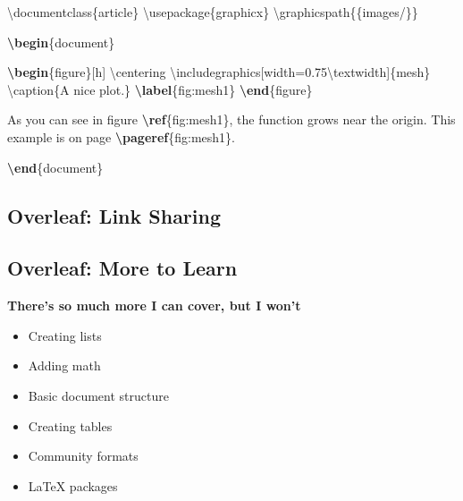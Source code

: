 \documentclass[
  letterpaper,
  DIV=11,
  numbers=noendperiod]{scrartcl}
\newenvironment{Shaded}{\begin{snugshade}}{\end{snugshade}}
\newcommand{\BuiltInTok}[1]{\textcolor[rgb]{0.00,0.23,0.31}{#1}}
\newcommand{\ExtensionTok}[1]{\textcolor[rgb]{0.00,0.23,0.31}{#1}}
\newcommand{\FunctionTok}[1]{\textcolor[rgb]{0.28,0.35,0.67}{#1}}
\newcommand{\KeywordTok}[1]{\textcolor[rgb]{0.00,0.23,0.31}{\textbf{#1}}}
\newcommand{\NormalTok}[1]{\textcolor[rgb]{0.00,0.23,0.31}{#1}}
\providecommand{\tightlist}{%
  \setlength{\itemsep}{0pt}\setlength{\parskip}{0pt}}\usepackage{longtable,booktabs,array}
\begin{document}
\begin{Shaded}
\begin{Highlighting}[numbers=left,,]
\BuiltInTok{\textbackslash{}documentclass}\NormalTok{\{}\ExtensionTok{article}\NormalTok{\}}
\BuiltInTok{\textbackslash{}usepackage}\NormalTok{\{}\ExtensionTok{graphicx}\NormalTok{\}}
\FunctionTok{\textbackslash{}graphicspath}\NormalTok{\{\{images/\}\}}
 
\KeywordTok{\textbackslash{}begin}\NormalTok{\{}\ExtensionTok{document}\NormalTok{\}}

\KeywordTok{\textbackslash{}begin}\NormalTok{\{}\ExtensionTok{figure}\NormalTok{\}[h]}
    \FunctionTok{\textbackslash{}centering}
    \BuiltInTok{\textbackslash{}includegraphics}\NormalTok{[width=0.75}\FunctionTok{\textbackslash{}textwidth}\NormalTok{]\{}\ExtensionTok{mesh}\NormalTok{\}}
    \FunctionTok{\textbackslash{}caption}\NormalTok{\{A nice plot.\}}
    \KeywordTok{\textbackslash{}label}\NormalTok{\{}\ExtensionTok{fig:mesh1}\NormalTok{\}}
\KeywordTok{\textbackslash{}end}\NormalTok{\{}\ExtensionTok{figure}\NormalTok{\}}
 
\NormalTok{As you can see in figure }\KeywordTok{\textbackslash{}ref}\NormalTok{\{}\ExtensionTok{fig:mesh1}\NormalTok{\}, the function grows near the origin. This example is on page }\KeywordTok{\textbackslash{}pageref}\NormalTok{\{}\ExtensionTok{fig:mesh1}\NormalTok{\}.}

\KeywordTok{\textbackslash{}end}\NormalTok{\{}\ExtensionTok{document}\NormalTok{\}}
\end{Highlighting}
\end{Shaded}

\subsection{Overleaf: Link Sharing}\label{overleaf-link-sharing}

\subsection{Overleaf: More to Learn}\label{overleaf-more-to-learn}

\textbf{There's so much more I can cover, but I won't}

\begin{itemize}
\tightlist
\item
  Creating lists
\item
  Adding math
\item
  Basic document structure
\item
  Creating tables
\item
  Community formats
\item
  LaTeX packages
\end{itemize}
\end{document}
